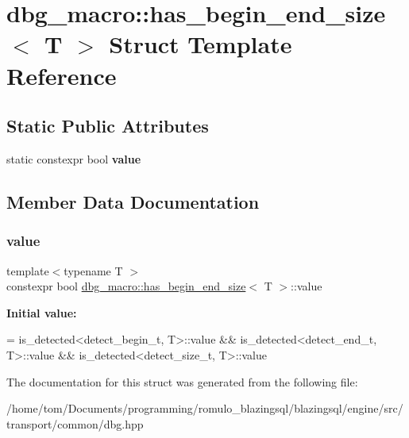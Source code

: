 \hypertarget{structdbg__macro_1_1has__begin__end__size}{}\section{dbg\+\_\+macro\+:\+:has\+\_\+begin\+\_\+end\+\_\+size$<$ T $>$ Struct Template Reference}
\label{structdbg__macro_1_1has__begin__end__size}
\subsection*{Static Public Attributes}
\begin{DoxyCompactItemize}
\item 
static constexpr bool {\bfseries value}
\end{DoxyCompactItemize}


\subsection{Member Data Documentation}
\mbox{\label{structdbg__macro_1_1has__begin__end__size_a9db965f9c127a0b284a4fd537c9ffe80}} 
\subsubsection{\texorpdfstring{value}{value}}
{\footnotesize\ttfamily template$<$typename T $>$ \\
constexpr bool \hyperlink{structdbg__macro_1_1has__begin__end__size}{dbg\+\_\+macro\+::has\+\_\+begin\+\_\+end\+\_\+size}$<$ T $>$\+::value\hspace{0.3cm}{\ttfamily [static]}}

{\bfseries Initial value\+:}
\begin{DoxyCode}
= is\_detected<detect\_begin\_t, T>::value &&
                                is\_detected<detect\_end\_t, T>::value &&
                                is\_detected<detect\_size\_t, T>::value
\end{DoxyCode}


The documentation for this struct was generated from the following file\+:\begin{DoxyCompactItemize}
\item 
/home/tom/\+Documents/programming/romulo\+\_\+blazingsql/blazingsql/engine/src/transport/common/dbg.\+hpp\end{DoxyCompactItemize}
